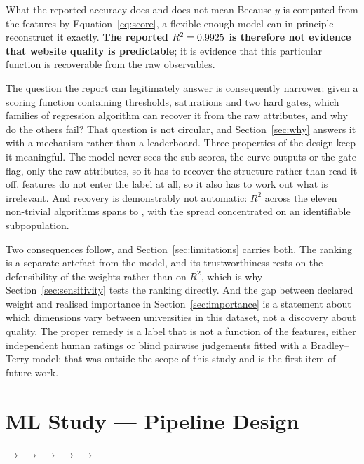 \documentclass[11pt,a4paper]{article}
\begin{document}
\begin{keybox}{What the reported accuracy does and does not mean}
Because $y$ is computed from the features by Equation~\eqref{eq:score}, a flexible enough model can
in principle reconstruct it exactly. \textbf{The reported $R^2 = 0.9925{}$ is therefore not evidence
that website quality is predictable}; it is evidence that this particular function is recoverable
from the raw observables.

The question the report can legitimately answer is consequently narrower: given a scoring function
containing thresholds, saturations and two hard gates, which families of regression algorithm can
recover it from the raw attributes, and why do the others fail? That question is not circular, and
Section~\ref{sec:why} answers it with a mechanism rather than a leaderboard. Three properties of the
design keep it meaningful. The model never sees the sub-scores, the curve outputs or the gate flag,
only the raw attributes, so it has to recover the structure rather than read it off. \nUnscored{}
features do not enter the label at all, so it also has to work out what is irrelevant. And recovery
is demonstrably not automatic: $R^2$ across the eleven non-trivial algorithms spans \rTwoMin{} to
\rTwoMax{}, with the spread concentrated on an identifiable subpopulation.
\end{keybox}

\noindent Two consequences follow, and Section~\ref{sec:limitations} carries both. The ranking is a
separate artefact from the model, and its trustworthiness rests on the defensibility of the weights
rather than on $R^2$, which is why Section~\ref{sec:sensitivity} tests the ranking directly. And the
gap between declared weight and realised importance in Section~\ref{sec:importance} is a statement
about which dimensions vary between universities in this dataset, not a discovery about quality. The
proper remedy is a label that is not a function of the features, either independent human ratings or
blind pairwise judgements fitted with a Bradley--Terry model; that was outside the scope of this
study and is the first item of future work.

\section{ML Study --- Pipeline Design}
\label{sec:pipeline}

\begin{center}\small
{} $\rightarrow$
 $\rightarrow$
 $\rightarrow$
 $\rightarrow$
 $\rightarrow$
\end{center}
\end{document}
